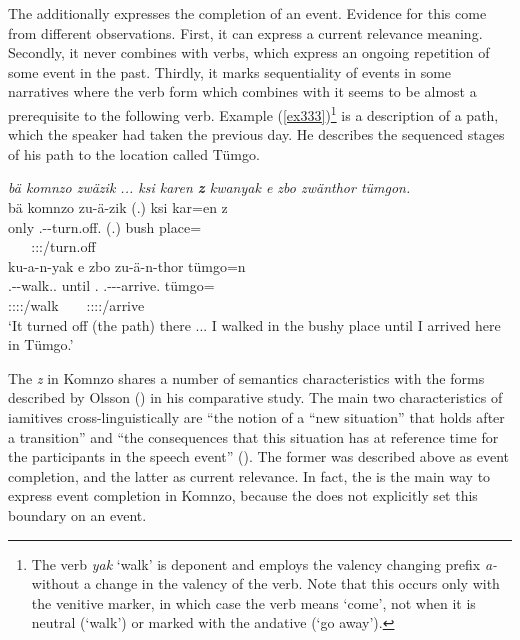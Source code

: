 The   additionally expresses the completion of an event. Evidence for this come from different observations. First, it can express a current relevance meaning. Secondly, it never combines with  verbs, which express an ongoing repetition of some event in the past. Thirdly, it marks sequentiality of events in some narratives where the verb form which combines with it seems to be almost a prerequisite to the following verb. Example (\ref{ex333})\footnote{The verb \emph{yak} ‘walk’ is deponent and employs the valency changing prefix \emph{a-} without a change in the valency of the verb. Note that this occurs only with the venitive marker, in which case the verb means ‘come’, not when it is neutral (‘walk’) or marked with the andative (‘go away’).} is a description of a path, which the speaker had taken the previous day. He describes the sequenced stages of his path to the location called Tümgo.

\begin{exe}
	\ex \emph{bä komnzo zwäzik ... ksi karen \textbf{z} kwanyak e zbo zwänthor tümgon.}\\
	\glll bä komnzo zu-ä-zik (.) ksi kar=en z\\
	\Med{} only \Fsg.\Gam-\Ndu-turn.off.{\Rs} (.) bush place={\Loc} {\Iam}\\
	~ ~ {\footnotesize \Fsg:\Sbj:\Rpst:\Pfv/turn.off} ~ ~ ~ ~\\
	\sn
	\glll ku-a-n-yak e zbo zu-ä-n-thor tümgo=n\\
	\Fsg.\Betaone-\Vc-walk.\Ext.{\Ndu} until \Prox.{\All} \Fsg.\Gam-\Ndu-\Venit-arrive.{\Rs} tümgo=\Loc\\
	{\footnotesize \Fsg:\Sbj:\Rpst:\Ipfv:\Venit/walk} ~ ~ {\footnotesize \Fsg:\Sbj:\Rpst:\Pfv:\Venit/arrive} ~\\
	\trans `It turned off (the path) there ... I walked in the bushy place until I arrived here in Tümgo.' 
	\label{ex333}
\end{exe}

The   \emph{z} in Komnzo shares a number of semantics characteristics with the forms described by Olsson (\citeyear{Olsson:2013vn}) in his comparative study. The main two characteristics of iamitives cross-linguistically are ``the notion of a “new situation” that holds after a transition'' and ``the consequences that this situation has at reference time for the participants in the speech event'' (\citeyear[43]{Olsson:2013vn}). The former was described above as event completion, and the latter as current relevance. In fact, the   is the main way to express event completion in Komnzo, because the   does not explicitly set this boundary on an event.

